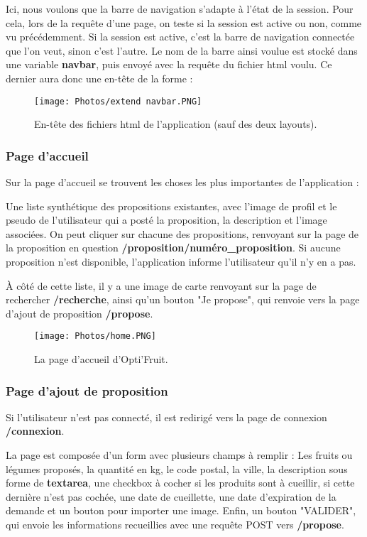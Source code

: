 \documentclass{article}
\begin{document}
Ici, nous voulons que la barre de navigation s'adapte à l'état de la session. Pour cela, lors de la requête d'une page, on teste si la session est active ou non, comme vu précédemment. Si la session est active, c'est la barre de navigation connectée que l'on veut, sinon c'est l'autre. Le nom de la barre ainsi voulue est stocké dans une variable \textbf{navbar}, puis envoyé avec la requête du fichier html voulu. Ce dernier aura donc une en-tête de la forme : 
\begin{figure}[h!]
    \centering
    \texttt{[image: Photos/extend navbar.PNG]}
    \caption{En-tête des fichiers html de l'application (sauf des deux layouts).}
    \label{fig:my_label}
\end{figure}

\subsubsection{Page d'accueil}
Sur la page d'accueil se trouvent les choses les plus importantes de l'application :

Une liste synthétique des propositions existantes, avec l'image de profil et le pseudo de l'utilisateur qui a posté la proposition, la description et l'image associées.
On peut cliquer sur chacune des propositions, renvoyant sur la page de la proposition en question \textbf{/proposition/numéro\_proposition}. Si aucune proposition n'est disponible, l'application informe l'utilisateur qu'il n'y en a pas.

À côté de cette liste, il y a une image de carte renvoyant sur la page de rechercher \textbf{/recherche}, ainsi qu'un bouton "Je propose", qui renvoie vers la page d'ajout de proposition \textbf{/propose}.

\begin{figure}[h!]
    \centering
    \texttt{[image: Photos/home.PNG]}
    \caption{La page d'accueil d'Opti'Fruit.}
    \label{fig:my_label}
\end{figure}

\vspace{5cm}
\subsubsection{Page d'ajout de proposition}

Si l'utilisateur n'est pas connecté, il est redirigé vers la page de connexion \textbf{/connexion}.

La page est composée d'un form avec plusieurs champs à remplir : Les fruits ou légumes proposés, la quantité en kg, le code postal, la ville, la description sous forme de \textbf{textarea}, une checkbox à cocher si les produits sont à cueillir, si cette dernière n'est pas cochée, une date de cueillette, une date d'expiration de la demande et un bouton pour importer une image. Enfin, un bouton "VALIDER", qui envoie les informations recueillies avec une requête POST vers \textbf{/propose}.
\end{document}
